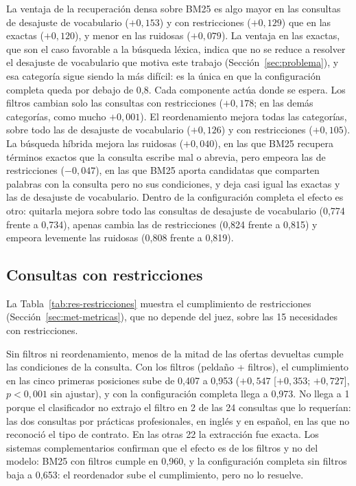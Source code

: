 La ventaja de la recuperación densa sobre BM25 es algo mayor en las consultas de desajuste de vocabulario ($+0{,}153$) y con restricciones ($+0{,}129$) que en las exactas ($+0{,}120$), y menor en las ruidosas ($+0{,}079$). La ventaja en las exactas, que son el caso favorable a la búsqueda léxica, indica que no se reduce a resolver el desajuste de vocabulario que motiva este trabajo (Sección~\ref{sec:problema}), y esa categoría sigue siendo la más difícil: es la única en que la configuración completa queda por debajo de 0,8. Cada componente actúa donde se espera. Los filtros cambian solo las consultas con restricciones ($+0{,}178$; en las demás categorías, como mucho $+0{,}001$). El reordenamiento mejora todas las categorías, sobre todo las de desajuste de vocabulario ($+0{,}126$) y con restricciones ($+0{,}105$). La búsqueda híbrida mejora las ruidosas ($+0{,}040$), en las que BM25 recupera términos exactos que la consulta escribe mal o abrevia, pero empeora las de restricciones ($-0{,}047$), en las que BM25 aporta candidatas que comparten palabras con la consulta pero no sus condiciones, y deja casi igual las exactas y las de desajuste de vocabulario. Dentro de la configuración completa el efecto es otro: quitarla mejora sobre todo las consultas de desajuste de vocabulario (0,774 frente a 0,734), apenas cambia las de restricciones (0,824 frente a 0,815) y empeora levemente las ruidosas (0,808 frente a 0,819).

\subsection{Consultas con restricciones}

La Tabla~\ref{tab:res-restricciones} muestra el cumplimiento de restricciones (Sección~\ref{sec:met-metricas}), que no depende del juez, sobre las 15 necesidades con restricciones.



Sin filtros ni reordenamiento, menos de la mitad de las ofertas devueltas cumple las condiciones de la consulta. Con los filtros (peldaño + filtros), el cumplimiento en las cinco primeras posiciones sube de 0,407 a 0,953 ($+0{,}547$ [$+0{,}353$; $+0{,}727$], $p < 0{,}001$ sin ajustar), y con la configuración completa llega a 0,973. No llega a 1 porque el clasificador no extrajo el filtro en 2 de las 24 consultas que lo requerían: las dos consultas por prácticas profesionales, en inglés y en español, en las que no reconoció el tipo de contrato. En las otras 22 la extracción fue exacta. Los sistemas complementarios confirman que el efecto es de los filtros y no del modelo: BM25 con filtros cumple en 0,960, y la configuración completa sin filtros baja a 0,653: el reordenador sube el cumplimiento, pero no lo resuelve.

